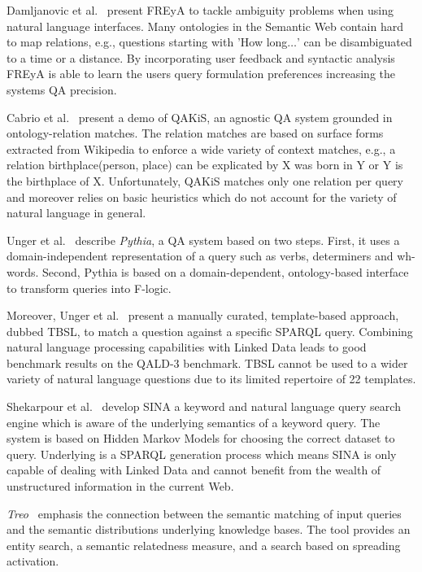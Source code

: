 {Damljanovic et al.~\cite{freya}} present {FREyA} to tackle ambiguity problems when using natural language interfaces. 
Many ontologies in the Semantic Web contain hard to map relations, e.g., questions starting with 'How long$\ldots$' can be disambiguated to a time or a distance. 
By incorporating user feedback and syntactic analysis FREyA is able to learn the users query formulation preferences increasing the systems \ac{QA} precision. 

{Cabrio et al.~\cite{qakis}} present a demo of {QAKiS}, an agnostic QA system grounded in ontology-relation matches. 
The relation matches are based on surface forms extracted from Wikipedia to enforce a wide variety of context matches, e.g., a relation birthplace(person, place) can be explicated by X was born in Y or Y is the birthplace of X. 
Unfortunately, QAKiS matches only one relation per query and moreover relies on basic heuristics which do not account for the variety of natural language in general.

{Unger et al.~\cite{pythia}} describe \emph{Pythia}, a \ac{QA} system based on two steps.
First, it uses a domain-independent representation of a query such as verbs, determiners and wh-words.
Second, Pythia is based on a domain-dependent, ontology-based interface to transform queries into F-logic.


Moreover, Unger et al.~\cite{template} present a manually curated, template-based approach, dubbed {TBSL}, to match a question against a specific SPARQL query. 
Combining natural language processing capabilities with Linked Data leads to good benchmark results on the QALD-3 benchmark.
TBSL cannot be used to a wider variety of natural language questions due to its limited repertoire of 22 templates.

{Shekarpour et al.~\cite{SINA_WebSemantic}} develop {SINA} a keyword and natural language query search engine which is aware of the underlying semantics of a keyword query. 
The system is based on Hidden Markov Models for choosing the correct dataset to query.
Underlying is a SPARQL generation process which means SINA is only capable of dealing with Linked Data and cannot benefit from the wealth of unstructured information in the current Web.


\emph{Treo}~\cite{treo} emphasis the connection between the semantic matching of input queries and the semantic distributions underlying knowledge bases.
The tool provides an entity search, a semantic relatedness measure, and a search based on spreading activation.

